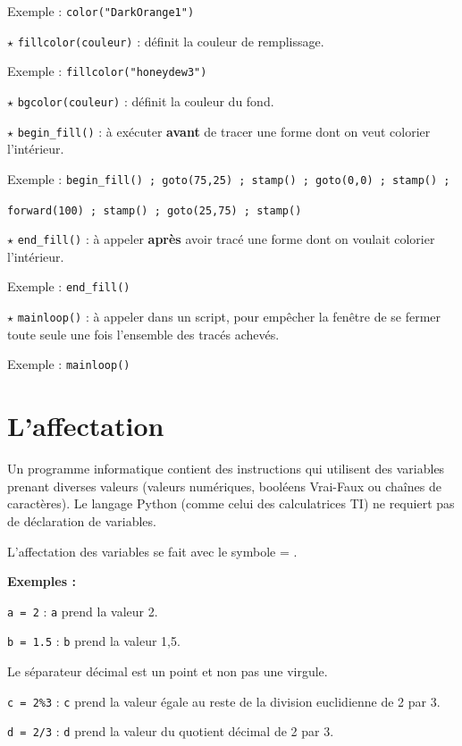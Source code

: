 Exemple : \verb!color("DarkOrange1")!

$\star$ \verb!fillcolor(couleur)! : définit la couleur de remplissage.

Exemple : \verb!fillcolor("honeydew3")!

$\star$ \verb!bgcolor(couleur)! : définit la couleur du fond.

$\star$ \verb!begin_fill()! : à exécuter \textbf{avant} de tracer une forme dont on veut colorier l'intérieur.

Exemple : \verb!begin_fill() ; goto(75,25) ; stamp() ; goto(0,0) ; stamp() ;! 

\verb!forward(100) ; stamp() ; goto(25,75) ; stamp()!

$\star$ \verb!end_fill()! : à appeler \textbf{après} avoir tracé une forme dont on voulait colorier l'intérieur.

Exemple : \verb!end_fill()!

$\star$ \verb!mainloop()! : à appeler dans un script, pour empêcher la fenêtre de se fermer toute seule une
fois l'ensemble des tracés achevés.

Exemple : \verb!mainloop()!



\section{L'affectation}

Un programme informatique contient des instructions qui utilisent des variables prenant diverses valeurs
(valeurs numériques, booléens Vrai-Faux ou chaînes de caractères). Le langage Python (comme celui des calculatrices TI) ne requiert pas
de déclaration de variables.


L'affectation des variables se fait avec le symbole \og = \fg{}.

\textbf{\large Exemples :}

\verb!a = 2!  : \verb!a! prend la valeur 2.

\verb!b = 1.5! : \verb!b! prend la valeur 1,5. 

\danger Le séparateur décimal est un point et non pas une virgule.

\verb!c = 2%3! : \verb!c! prend la valeur égale au reste de la division euclidienne de 2 par 3.

\verb!d = 2/3! : \verb!d! prend la valeur du quotient décimal de 2 par 3.

